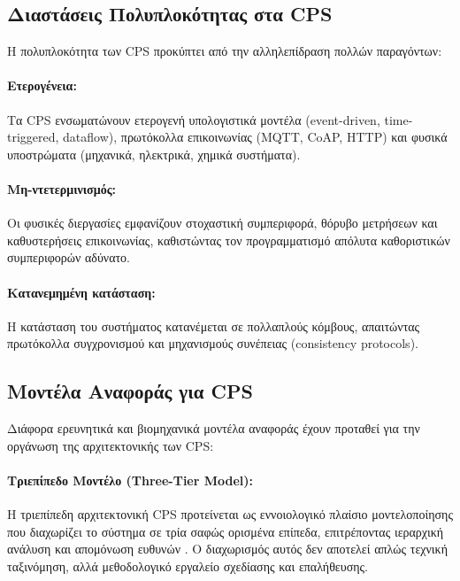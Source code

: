 \subsection{Διαστάσεις Πολυπλοκότητας στα CPS}

Η πολυπλοκότητα των CPS προκύπτει από την αλληλεπίδραση πολλών παραγόντων:

\paragraph{Ετερογένεια:} Τα CPS ενσωματώνουν ετερογενή υπολογιστικά μοντέλα
(event-driven, time-triggered, dataflow), πρωτόκολλα επικοινωνίας (MQTT, CoAP,
HTTP) και φυσικά υποστρώματα (μηχανικά, ηλεκτρικά, χημικά συστήματα).

\paragraph{Μη-ντετερμινισμός:} Οι φυσικές διεργασίες εμφανίζουν στοχαστική
συμπεριφορά, θόρυβο μετρήσεων και καθυστερήσεις επικοινωνίας, καθιστώντας τον
προγραμματισμό απόλυτα καθοριστικών συμπεριφορών αδύνατο.

\paragraph{Κατανεμημένη κατάσταση:} Η κατάσταση του συστήματος κατανέμεται σε
πολλαπλούς κόμβους, απαιτώντας πρωτόκολλα συγχρονισμού και μηχανισμούς
συνέπειας (consistency protocols).

\subsection{Μοντέλα Αναφοράς για CPS}

Διάφορα ερευνητικά και βιομηχανικά μοντέλα αναφοράς έχουν προταθεί για την
οργάνωση της αρχιτεκτονικής των CPS:

\paragraph{Τριεπίπεδο Μοντέλο (Three-Tier Model):}

Η τριεπίπεδη αρχιτεκτονική CPS προτείνεται ως εννοιολογικό πλαίσιο
μοντελοποίησης που διαχωρίζει το σύστημα σε τρία σαφώς ορισμένα επίπεδα,
επιτρέποντας ιεραρχική ανάλυση και απομόνωση ευθυνών
\cite{boulila2017cpsmodeling}. Ο διαχωρισμός αυτός δεν αποτελεί απλώς τεχνική
ταξινόμηση, αλλά μεθοδολογικό εργαλείο σχεδίασης και επαλήθευσης.

